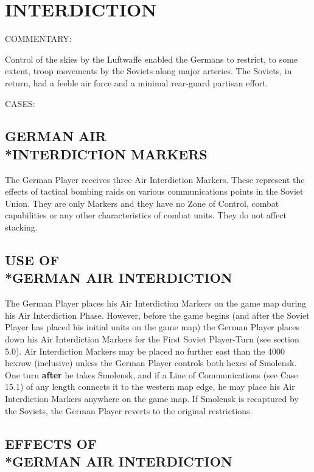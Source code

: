 \section{INTERDICTION}

\begingroup
\setlength{\parskip}{0pt}
\noindent COMMENTARY:\par
\noindent Control of the skies by the Luftwaffe enabled the Germans to restrict, to some extent, troop movements by the Soviets along major arteries. The Soviets, in return, had a feeble air force and a minimal rear-guard partisan effort.\par
\medskip
\noindent CASES:\par
\endgroup

\subsection{GERMAN AIR\\*INTERDICTION MARKERS}

The German Player receives three Air Interdiction Markers. These represent the effects of tactical bombing raids on various communications points in the Soviet Union. They are only Markers and they have no Zone of Control, combat capabilities or any other characteristics of combat units. They do not affect stacking.

\subsection{USE OF\\*GERMAN AIR INTERDICTION}

The German Player places his Air Interdiction Markers on the game map during his Air Interdiction Phase. However, before the game begins (and after the Soviet Player has placed his initial units on the game map) the German Player places down his Air Interdiction Markers for the First Soviet Player-Turn (see section 5.0). Air Interdiction Markers may be placed no further east than the 4000 hexrow (inclusive) unless the German Player controls both hexes of Smolensk. One turn \textbf{after} he takes Smolensk, and if a Line of Communications (see Case 15.1) of any length connects it to the western map edge, he may place his Air Interdiction Markers anywhere on the game map. If Smolensk is recaptured by the Soviets, the German Player reverts to the original restrictions.

\subsection{EFFECTS OF\\*GERMAN AIR INTERDICTION}

